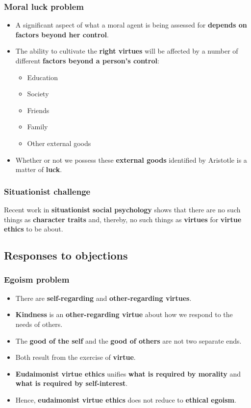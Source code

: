 \documentclass[11pt]{article}
\begin{document}
\subsubsection{Moral luck problem}
\label{sec:orgcb7dd01}
\begin{itemize}
\item A significant aspect of what a moral agent is being assessed for \textbf{depends on factors beyond her control}.
\item The ability to cultivate the \textbf{right virtues} will be affected by a number of different \textbf{factors beyond a person's control}:
\begin{itemize}
\item Education
\item Society
\item Friends
\item Family
\item Other external goods
\end{itemize}
\item Whether or not we possess these \textbf{external goods} identified by Aristotle is a matter of \textbf{luck}.
\end{itemize}
\subsubsection{Situationist challenge}
\label{sec:org783c702}
Recent work in \textbf{situationist social psychology} shows that there are no such things as \textbf{character traits} and, thereby, no such things as \textbf{virtues} for \textbf{virtue ethics} to be about.
\subsection{Responses to objections}
\label{sec:org569493f}

\subsubsection{Egoism problem}
\label{sec:orgdcc9f32}
\begin{itemize}
\item There are \textbf{self-regarding} and \textbf{other-regarding virtues}.
\item \textbf{Kindness} is an \textbf{other-regarding virtue} about how we respond to the needs of others.
\item The \textbf{good of the self} and the \textbf{good of others} are not two separate ends.
\item Both result from the exercise of \textbf{virtue}.
\item \textbf{Eudaimonist virtue ethics} unifies \textbf{what is required by morality} and \textbf{what is required by self-interest}.
\item Hence, \textbf{eudaimonist virtue ethics} does not reduce to \textbf{ethical egoism}.
\end{itemize}
\end{document}
